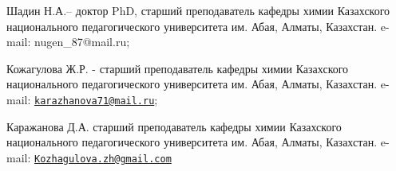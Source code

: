\begin{authorinfo}
Шадин Н.А.-- доктор PhD, старший преподаватель кафедры химии
Казахского национального педагогического университета им. Абая,
Алматы, Казахстан. e-mail: nugen\_87@mail.ru;

Кожагулова Ж.Р. - старший преподаватель кафедры химии Казахского
национального педагогического университета им. Абая, Алматы,
Казахстан. e-mail:
\href{mailto:karazhanova71@mail.ru}{\nolinkurl{karazhanova71@mail.ru}};

Каражанова Д.А. старший преподаватель кафедры химии Казахского
национального педагогического университета им. Абая, Алматы,
Казахстан. e-mail:
\href{mailto:Kozhagulova.zh@gmail.com}{\nolinkurl{Kozhagulova.zh@gmail.com}}
\end{authorinfo}
